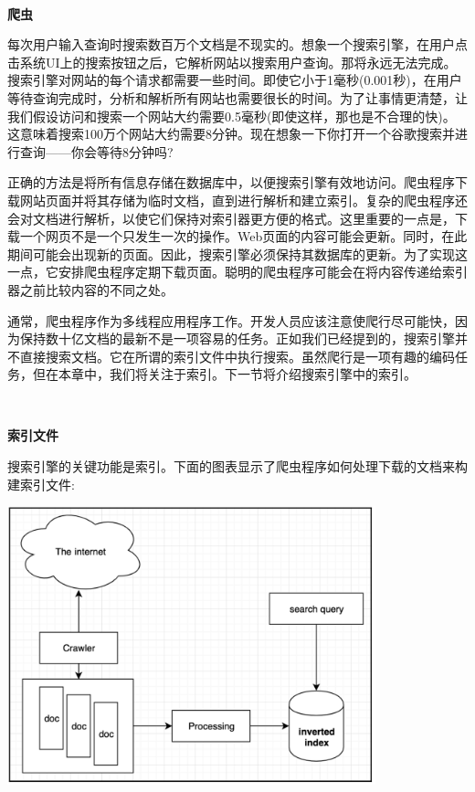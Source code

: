 \noindent\textbf{}\ \par
\textbf{爬虫} \ \par
每次用户输入查询时搜索数百万个文档是不现实的。想象一个搜索引擎，在用户点击系统UI上的搜索按钮之后，它解析网站以搜索用户查询。那将永远无法完成。搜索引擎对网站的每个请求都需要一些时间。即使它小于1毫秒(0.001秒)，在用户等待查询完成时，分析和解析所有网站也需要很长的时间。为了让事情更清楚，让我们假设访问和搜索一个网站大约需要0.5毫秒(即使这样，那也是不合理的快)。这意味着搜索100万个网站大约需要8分钟。现在想象一下你打开一个谷歌搜索并进行查询——你会等待8分钟吗? \par
正确的方法是将所有信息存储在数据库中，以便搜索引擎有效地访问。爬虫程序下载网站页面并将其存储为临时文档，直到进行解析和建立索引。复杂的爬虫程序还会对文档进行解析，以使它们保持对索引器更方便的格式。这里重要的一点是，下载一个网页不是一个只发生一次的操作。Web页面的内容可能会更新。同时，在此期间可能会出现新的页面。因此，搜索引擎必须保持其数据库的更新。为了实现这一点，它安排爬虫程序定期下载页面。聪明的爬虫程序可能会在将内容传递给索引器之前比较内容的不同之处。 \par
通常，爬虫程序作为多线程应用程序工作。开发人员应该注意使爬行尽可能快，因为保持数十亿文档的最新不是一项容易的任务。正如我们已经提到的，搜索引擎并不直接搜索文档。它在所谓的索引文件中执行搜索。虽然爬行是一项有趣的编码任务，但在本章中，我们将关注于索引。下一节将介绍搜索引擎中的索引。 \par

\noindent\textbf{}\ \par
\textbf{索引文件} \ \par
搜索引擎的关键功能是索引。下面的图表显示了爬虫程序如何处理下载的文档来构建索引文件: \par

\begin{center}
	\includegraphics[width=0.8\textwidth]{content/Section-3/Chapter-16/7}
\end{center}

